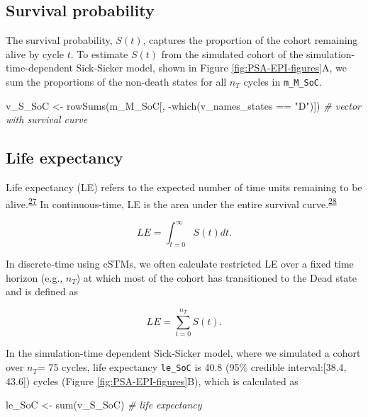 \documentclass[
]{article}
\newenvironment{Shaded}{\begin{snugshade}}{\end{snugshade}}
\newcommand{\CommentTok}[1]{\textcolor[rgb]{0.56,0.35,0.01}{\textit{#1}}}
\newcommand{\FunctionTok}[1]{\textcolor[rgb]{0.00,0.00,0.00}{#1}}
\newcommand{\NormalTok}[1]{#1}
\newcommand{\OtherTok}[1]{\textcolor[rgb]{0.56,0.35,0.01}{#1}}
\newcommand{\SpecialCharTok}[1]{\textcolor[rgb]{0.00,0.00,0.00}{#1}}
\newcommand{\StringTok}[1]{\textcolor[rgb]{0.31,0.60,0.02}{#1}}
\begin{document}
\hypertarget{survival-probability}{%
\subsection{Survival probability}\label{survival-probability}}

The survival probability, \(S(t)\), captures the proportion of the cohort remaining alive by cycle \(t\). To estimate \(S(t)\) from the simulated cohort of the simulation-time-dependent Sick-Sicker model, shown in Figure \ref{fig:PSA-EPI-figures}A, we sum the proportions of the non-death states for all \(n_T\) cycles in \texttt{m\_M\_SoC}.

\begin{Shaded}
\begin{Highlighting}[]
\NormalTok{v\_S\_SoC }\OtherTok{\textless{}{-}} \FunctionTok{rowSums}\NormalTok{(m\_M\_SoC[, }\SpecialCharTok{{-}}\FunctionTok{which}\NormalTok{(v\_names\_states }\SpecialCharTok{==} \StringTok{"D"}\NormalTok{)]) }\CommentTok{\# vector with survival curve}
\end{Highlighting}
\end{Shaded}

\hypertarget{life-expectancy}{%
\subsection{Life expectancy}\label{life-expectancy}}

Life expectancy (LE) refers to the expected number of time units remaining to be alive.\textsuperscript{\protect\hyperlink{ref-Lee2003a}{27}} In continuous-time, LE is the area under the entire survival curve.\textsuperscript{\protect\hyperlink{ref-Klein2003}{28}}

\[
LE = \int_{t=0}^{\infty}{S(t) dt}.
\]

In discrete-time using cSTMs, we often calculate restricted LE over a fixed time horizon (e.g., \(n_T\)) at which most of the cohort has transitioned to the Dead state and is defined as

\[
  LE = \sum_{t=0}^{n_T}{S(t)}.
\]

In the simulation-time dependent Sick-Sicker model, where we simulated a cohort over \(n_T\)= 75 cycles, life expectancy \texttt{le\_SoC} is 40.8 (95\% credible interval:{[}38.4, 43.6{]}) cycles (Figure \ref{fig:PSA-EPI-figures}B), which is calculated as

\begin{Shaded}
\begin{Highlighting}[]
\NormalTok{le\_SoC }\OtherTok{\textless{}{-}} \FunctionTok{sum}\NormalTok{(v\_S\_SoC) }\CommentTok{\# life expectancy}
\end{Highlighting}
\end{Shaded}
\end{document}
